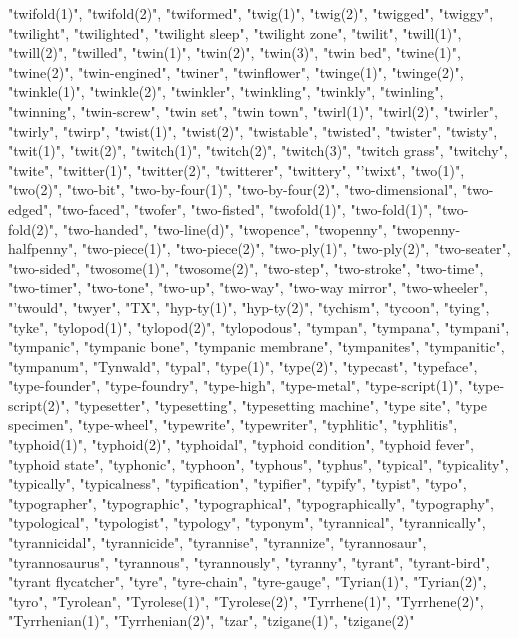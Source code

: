 "twifold(1)",
"twifold(2)",
"twiformed",
"twig(1)",
"twig(2)",
"twigged",
"twiggy",
"twilight",
"twilighted",
"twilight sleep",
"twilight zone",
"twilit",
"twill(1)",
"twill(2)",
"twilled",
"twin(1)",
"twin(2)",
"twin(3)",
"twin bed",
"twine(1)",
"twine(2)",
"twin-engined",
"twiner",
"twinflower",
"twinge(1)",
"twinge(2)",
"twinkle(1)",
"twinkle(2)",
"twinkler",
"twinkling",
"twinkly",
"twinling",
"twinning",
"twin-screw",
"twin set",
"twin town",
"twirl(1)",
"twirl(2)",
"twirler",
"twirly",
"twirp",
"twist(1)",
"twist(2)",
"twistable",
"twisted",
"twister",
"twisty",
"twit(1)",
"twit(2)",
"twitch(1)",
"twitch(2)",
"twitch(3)",
"twitch grass",
"twitchy",
"twite",
"twitter(1)",
"twitter(2)",
"twitterer",
"twittery",
"'twixt",
"two(1)",
"two(2)",
"two-bit",
"two-by-four(1)",
"two-by-four(2)",
"two-dimensional",
"two-edged",
"two-faced",
"twofer",
"two-fisted",
"twofold(1)",
"two-fold(1)",
"two-fold(2)",
"two-handed",
"two-line(d)",
"twopence",
"twopenny",
"twopenny-halfpenny",
"two-piece(1)",
"two-piece(2)",
"two-ply(1)",
"two-ply(2)",
"two-seater",
"two-sided",
"twosome(1)",
"twosome(2)",
"two-step",
"two-stroke",
"two-time",
"two-timer",
"two-tone",
"two-up",
"two-way",
"two-way mirror",
"two-wheeler",
"'twould",
"twyer",
"TX",
"hyp-ty(1)",
"hyp-ty(2)",
"tychism",
"tycoon",
"tying",
"tyke",
"tylopod(1)",
"tylopod(2)",
"tylopodous",
"tympan",
"tympana",
"tympani",
"tympanic",
"tympanic bone",
"tympanic membrane",
"tympanites",
"tympanitic",
"tympanum",
"Tynwald",
"typal",
"type(1)",
"type(2)",
"typecast",
"typeface",
"type-founder",
"type-foundry",
"type-high",
"type-metal",
"type-script(1)",
"type-script(2)",
"typesetter",
"typesetting",
"typesetting machine",
"type site",
"type specimen",
"type-wheel",
"typewrite",
"typewriter",
"typhlitic",
"typhlitis",
"typhoid(1)",
"typhoid(2)",
"typhoidal",
"typhoid condition",
"typhoid fever",
"typhoid state",
"typhonic",
"typhoon",
"typhous",
"typhus",
"typical",
"typicality",
"typically",
"typicalness",
"typification",
"typifier",
"typify",
"typist",
"typo",
"typographer",
"typographic",
"typographical",
"typographically",
"typography",
"typological",
"typologist",
"typology",
"typonym",
"tyrannical",
"tyrannically",
"tyrannicidal",
"tyrannicide",
"tyrannise",
"tyrannize",
"tyrannosaur",
"tyrannosaurus",
"tyrannous",
"tyrannously",
"tyranny",
"tyrant",
"tyrant-bird",
"tyrant flycatcher",
"tyre",
"tyre-chain",
"tyre-gauge",
"Tyrian(1)",
"Tyrian(2)",
"tyro",
"Tyrolean",
"Tyrolese(1)",
"Tyrolese(2)",
"Tyrrhene(1)",
"Tyrrhene(2)",
"Tyrrhenian(1)",
"Tyrrhenian(2)",
"tzar",
"tzigane(1)",
"tzigane(2)"
